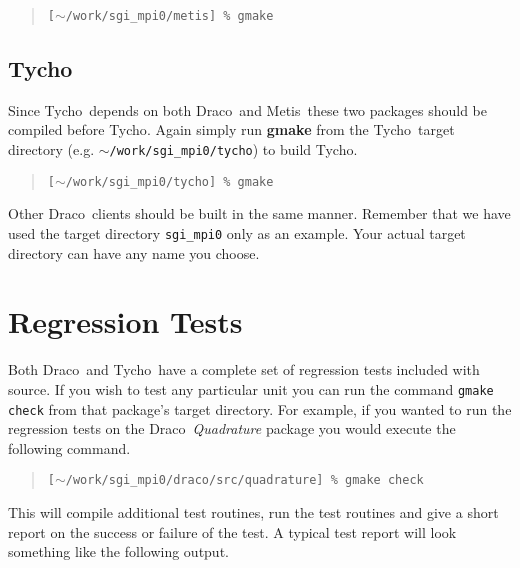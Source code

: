 \documentclass[11pt]{nmemo}
\newcommand{\comp}[1]{\normalfont\footnotesize\texttt{#1}\normalsize}
\newcommand{\draco}{{\normalfont\sffamily Draco}}
\newcommand{\tycho}{{\normalfont\sffamily Tycho}}
\newcommand{\metis}{{\normalfont\sffamily Metis}}
\begin{document}
\footnotesize
\begin{verse}
\texttt{[$\sim$/work/sgi\_mpi0/metis] \% gmake}
\end{verse}
\normalsize

\subsection{\tycho}

Since \tycho\ depends on both \draco\ and \metis\ these two packages
should be compiled before \tycho.  Again simply run \textbf{gmake}
from the \tycho\ target directory (e.g. \comp{$\sim$/work/sgi\_mpi0/tycho})
to build \tycho.

\footnotesize
\begin{verse}
\texttt{[$\sim$/work/sgi\_mpi0/tycho] \% gmake}
\end{verse}
\normalsize

Other \draco\ clients should be built in the same manner.  Remember
that we have used the target directory \comp{sgi\_mpi0} only as an
example.  Your actual target directory can have any name you choose.


\section{Regression Tests}
\label{regression}

Both \draco\ and \tycho\ have a complete set of regression tests
included with source.  If you wish to test any particular unit you can
run the command \comp{gmake check} from that package's target
directory.  For example, if you wanted to run the regression tests on
the \draco\ \emph{Quadrature} package you would execute the following
command.

\footnotesize
\begin{verse}
\texttt{[$\sim$/work/sgi\_mpi0/draco/src/quadrature] \% gmake check}
\end{verse}
\normalsize

This will compile additional test routines, run the test routines
and give a short report on the success or failure of the test.  A
typical test report will look something like the following output.
\end{document}
